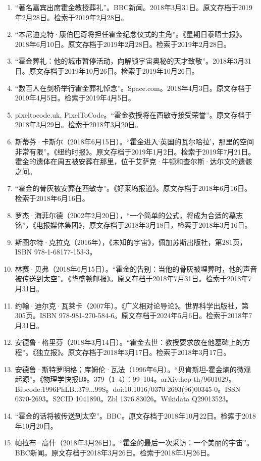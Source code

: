 \begin{enumerate}
\item “著名嘉宾出席霍金教授葬礼”。BBC新闻。2018年3月31日。原文存档于2019年2月28日。检索于2019年2月28日。
\item “本尼迪克特·康伯巴奇将担任霍金纪念仪式的主角”。《星期日泰晤士报》。2018年6月10日。原文存档于2019年2月28日。检索于2019年2月28日。
\item “霍金葬礼：他的城市暂停活动，向解锁宇宙奥秘的天才致敬”。2018年3月31日。原文存档于2019年10月26日。检索于2019年10月26日。
\item “数百人在剑桥举行霍金葬礼悼念”。Space.com。2018年4月3日。原文存档于2019年4月5日。检索于2019年4月5日。
\item pixeltocode.uk, PixelToCode。“霍金教授将在西敏寺接受荣誉”。原文存档于2018年3月29日。检索于2018年3月20日。
\item 斯蒂芬·卡斯尔（2018年6月15日）。“霍金进入‘英国的瓦尔哈拉’，那里的空间非常有限”。《纽约时报》。原文存档于2019年1月2日。检索于2019年7月21日。霍金的遗体在周五被安葬在那里，位于艾萨克·牛顿和查尔斯·达尔文的遗骸之间。
\item “霍金的骨灰被安葬在西敏寺”。《好莱坞报道》。原文存档于2018年6月16日。检索于2018年6月16日。
\item 罗杰·海菲尔德（2002年2月20日），“一个简单的公式，将成为合适的墓志铭”，《电报媒体集团》，原文存档于2018年3月18日，检索于2018年3月16日。
\item 斯图尔特·克拉克（2016年），《未知的宇宙》，佩加苏斯出版社，第281页，ISBN 978-1-68177-153-3。
\item 林赛·贝弗（2018年6月15日）。“霍金的告别：当他的骨灰被埋葬时，他的声音被传送到太空”。《华盛顿邮报》。原文存档于2018年7月31日。检索于2018年7月31日。
\item 约翰·迪尔克·瓦莱卡（2007年）。《广义相对论导论》。世界科学出版社，第305页。ISBN 978-981-270-584-6。原文存档于2024年5月6日。检索于2018年7月31日。
\item 安德鲁·格里芬（2018年3月14日）。“霍金去世：教授要求放在他墓碑上的方程”。《独立报》。原文存档于2018年3月17日。检索于2018年3月17日。
\item 安德鲁·斯特罗明格；库姆伦·瓦法（1996年6月）。“贝肯斯坦-霍金熵的微观起源”。《物理学快报B》。379（1–4）：99–104。arXiv:hep-th/9601029。Bibcode:1996PhLB..379...99S。doi:10.1016/0370-2693(96)00345-0。ISSN 0370-2693。S2CID 1041890。Zbl 1376.83026。Wikidata Q29013523。
\item “霍金的话将被传送到太空”。BBC。原文存档于2018年10月22日。检索于2018年10月20日。
\item 帕拉布·高什（2018年3月26日）。“霍金的最后一次采访：一个美丽的宇宙”。BBC新闻。原文存档于2018年3月26日。检索于2018年3月26日。

\end{enumerate}
